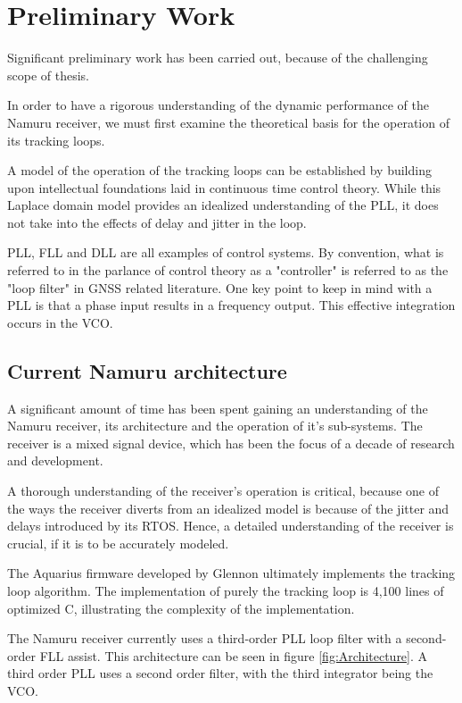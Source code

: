 \chapter{Preliminary Work}\label{ch:PreliminaryWork}
Significant preliminary work has been carried out, because of the challenging scope of thesis. 

In order to have a rigorous understanding of the dynamic performance of the Namuru receiver, we must first examine the theoretical basis for the operation of its tracking loops. 

A model of the operation of the tracking loops can be established by building upon intellectual foundations laid in continuous time control theory. While this Laplace domain model provides an idealized understanding of the \ac{PLL}, it does not take into the effects of delay and jitter in the loop. 

\ac{PLL}, \ac{FLL} and \ac{DLL} are all examples of control systems. By convention, what is referred to in the parlance of control theory as a "controller" is referred to as the "loop filter" in \ac{GNSS} related literature. One key point to keep in mind with a \ac{PLL} is that a phase input results in a frequency output. This effective integration occurs in the \ac{VCO}.

\section{Current Namuru architecture}
A significant amount of time has been spent gaining an understanding of the Namuru receiver, its architecture and the operation of it's sub-systems. The receiver is a mixed signal device, which has been the focus of a decade of research and development. 

A thorough understanding of the receiver's operation is critical, because one of the ways the receiver diverts from an idealized model is because of the jitter and delays introduced by its \ac{RTOS}. Hence, a detailed understanding of the receiver is crucial, if it is to be accurately modeled. 

The Aquarius firmware developed by Glennon \cite{Glennon11aquariusfirmware} ultimately implements the tracking loop algorithm. The implementation of purely the tracking loop is 4,100 lines of optimized C, illustrating the complexity of the implementation.

The Namuru receiver currently uses a third-order \ac{PLL} loop filter with a second-order \ac{FLL} assist. This architecture can be seen in figure \ref{fig:Architecture}.  A third order \ac{PLL} uses a second order filter, with the third integrator being the \ac{VCO}.

